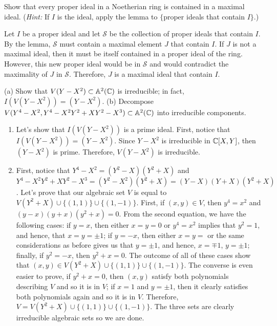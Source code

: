 \begin{exercise}
    Show that every proper ideal in a Noetherian ring is contained in a maximal ideal. (\textit{Hint:} If $I$ is the ideal, apply the lemma to $\{$proper ideals that contain $I\}$.) \\
\end{exercise}

\begin{solution}
    Let $I$ be a proper ideal and let $\mathscr{S}$ be the collection of proper ideals that contain $I$. By the lemma, $\mathscr{S}$ must contain a maximal element $J$ that contain $I$. If $J$ is not a maximal ideal, then it must be itself contained in a proper ideal of the ring. However, this new proper ideal would be in $\mathscr{S}$ and would contradict the maximality of $J$ in $\mathscr{S}$. Therefore, $J$ is a maximal ideal that contain $I$. \\
\end{solution}

\begin{exercise}
    (a) Show that $V(Y - X^2) \subset \mathbb{A}^2(\mathbb{C})$ is irreducible; in fact, $I(V(Y - X^2))= (Y - X^2)$. (b) Decompose $V(Y^4 - X^2, Y^4 - X^2Y^2 + XY^2 - X^3) \subset \mathbb{A}^2(\mathbb{C})$ into irreducible components. \\
\end{exercise}

\begin{solution}
    \begin{enumerate}[label=(\alph*)]
        \item Let's show that $I(V(Y - X^2))$ is a prime ideal. First, notice that $I(V(Y - X^2)) = (Y - X^2)$. Since $Y - X^2$ is irreducible in $\mathbb{C}[X,Y]$, then $(Y - X^2)$ is prime. Therefore, $V(Y - X^2)$ is irreducible.
        \item First, notice that $Y^4 - X^2 = (Y^2 - X)(Y^2 + X)$ and $Y^4 - X^2Y^2 + XY^2 - X^3 = (Y^2 - X^2)(Y^2 + X) = (Y - X)(Y+X)(Y^2 + X)$. Let's prove that our algebraic set $V$ is equal to $V(Y^2 + X) \cup \{(1,1)\}\cup \{(1,-1)\}$. First, if $(x, y) \in V$, then $y^4 = x^2$ and $(y - x)(y + x)(y^2 + x) = 0$. From the second equation, we have the following cases: if $y = x$, then either $x = y = 0$ or $y^4 = x^2$ implies that $y^2 = 1$, and hence, that $x = y = \pm 1$; if $y = -x$, then either $x = y = $ or the same considerations as before gives us that $y = \pm 1$, and hence, $x = \mp 1$, $y = \pm 1$; finally, if $y^2 = -x$, then $y^2 + x = 0$. The outcome of all of these cases show that $(x,y) \in V(Y^2 + X) \cup \{(1,1)\}\cup \{(1,-1)\}$. The converse is even easier to prove, if $y^2 + x = 0$, then $(x,y)$ satisfy both polynomials describing $V$ and so it is in $V$; if $x = 1$ and $y = \pm 1$, then it clearly satisfies both polynomials again and so it is in $V$. Therefore, $V = V(Y^2 + X) \cup \{(1,1)\}\cup \{(1,-1)\}$. The three sets are clearly irreducible algebraic sets so we are done. \\
    \end{enumerate}
\end{solution}

